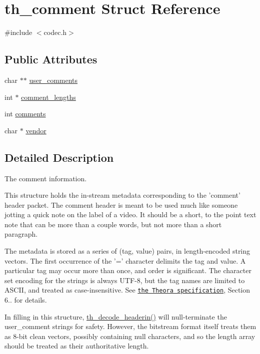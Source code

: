 \hypertarget{structth__comment}{\section{th\+\_\+comment Struct Reference}
\label{structth__comment}
}


{\ttfamily \#include $<$codec.\+h$>$}

\subsection*{Public Attributes}
\begin{DoxyCompactItemize}
\item 
char $\ast$$\ast$ \hyperlink{structth__comment_ad72830e183e707bb0df423eb73b00de4}{user\+\_\+comments}
\item 
int $\ast$ \hyperlink{structth__comment_a723dc6fdf75757e70e28eea864b10898}{comment\+\_\+lengths}
\item 
int \hyperlink{structth__comment_a5990c34932376f070ad0fc314daaeb78}{comments}
\item 
char $\ast$ \hyperlink{structth__comment_a93fbe894d23603f56843be15b0cbdba0}{vendor}
\end{DoxyCompactItemize}


\subsection{Detailed Description}
The comment information.

This structure holds the in-\/stream metadata corresponding to the 'comment' header packet. The comment header is meant to be used much like someone jotting a quick note on the label of a video. It should be a short, to the point text note that can be more than a couple words, but not more than a short paragraph.

The metadata is stored as a series of (tag, value) pairs, in length-\/encoded string vectors. The first occurrence of the '=' character delimits the tag and value. A particular tag may occur more than once, and order is significant. The character set encoding for the strings is always U\+T\+F-\/8, but the tag names are limited to A\+S\+C\+I\+I, and treated as case-\/insensitive. See \href{http://www.theora.org/doc/Theora.pdf}{\tt the Theora specification}, Section 6.. for details.

In filling in this structure, \hyperlink{group__decfuncs_ga006d01d36fbe64768c571e6a12b7fc50}{th\+\_\+decode\+\_\+headerin()} will null-\/terminate the user\+\_\+comment strings for safety. However, the bitstream format itself treats them as 8-\/bit clean vectors, possibly containing null characters, and so the length array should be treated as their authoritative length. 

